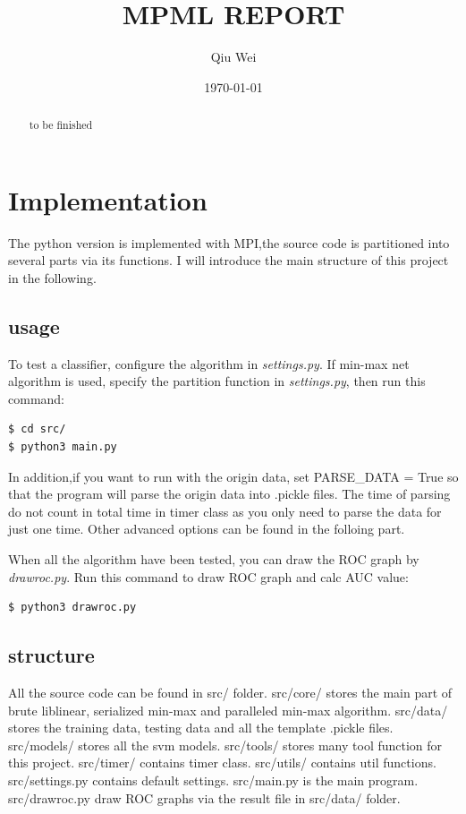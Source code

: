 \documentclass[11pt]{article}
\author{Qiu Wei}
\date{\today}
\title{MPML REPORT}
\begin{document}
\maketitle
\tableofcontents

\begin{abstract}
to be finished
\end{abstract}


\section{Implementation}
\label{sec-1}
The python version is implemented with MPI,the source code is partitioned into several
parts via its functions. I will introduce the main structure of this project in the following.

\subsection{usage}
\label{sec-1-1}
To test a classifier, configure the algorithm in \emph{settings.py}. If min-max net algorithm
is used, specify the partition function in \emph{settings.py}, then run this command:
\begin{verbatim}
$ cd src/
$ python3 main.py
\end{verbatim}
In addition,if you want to run with the origin data, set PARSE\_DATA = True so
that the program will parse the origin data into .pickle files. The time of
parsing do not count in total time in timer class as you only need to parse the
data for just one time. Other advanced options can be found in the folloing part.

When all the algorithm have been tested, you can draw the ROC graph by \emph{drawroc.py}.
Run this command to draw ROC graph and calc AUC value:
\begin{verbatim}
$ python3 drawroc.py
\end{verbatim}

\subsection{structure}
\label{sec-1-2}
All the source code can be found in src/ folder. src/core/ stores the main part of
brute liblinear, serialized min-max and paralleled min-max algorithm. src/data/ stores
the training data, testing data and all the template .pickle files. src/models/ stores
all the svm models. src/tools/ stores many tool function for this project. src/timer/
contains timer class. src/utils/ contains util functions. src/settings.py contains
default settings. src/main.py is the main program. src/drawroc.py draw ROC graphs
via the result file in src/data/ folder.
\end{document}
